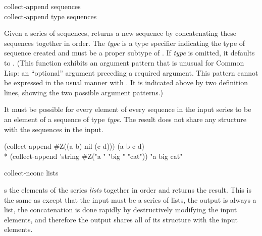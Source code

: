 \begin{defun}[Function]
collect-append sequences \\
collect-append type sequences

Given a series of sequences,  returns a new sequence by
concatenating these sequences together in order.  The \emph{type} is a type
specifier indicating the type of sequence created and must be a proper
subtype of .  If \emph{type} is omitted, it defaults to
.  (This function exhibits an argument pattern that is unusual for Common
Lisp:  an ``optional'' argument preceding a required argument.  This
pattern cannot be expressed in the usual manner with .  It
is indicated above by two definition lines, showing the two possible
argument patterns.)

It must be possible for every element of every sequence in the input series
to be an element of a sequence of type \emph{type}.  The result does not
share any structure with the sequences in the input.
\begin{lisp}
(collect-append \#Z((a b) nil (c d))) {\EV} (a b c d) \\*
(collect-append 'string \#Z("a " "big " "cat")) {\EV} "a big cat"
\end{lisp}
\end{defun}

\begin{defun}[Function]
collect-nconc lists

 s the elements of the series {\it
lists} together in order and returns the result.  This is the same as
 except that the input must be a series of lists,
the output is always a list, the concatenation is done rapidly by
destructively modifying the input elements, and therefore the output
shares all of its structure with the input elements.
\end{defun}

